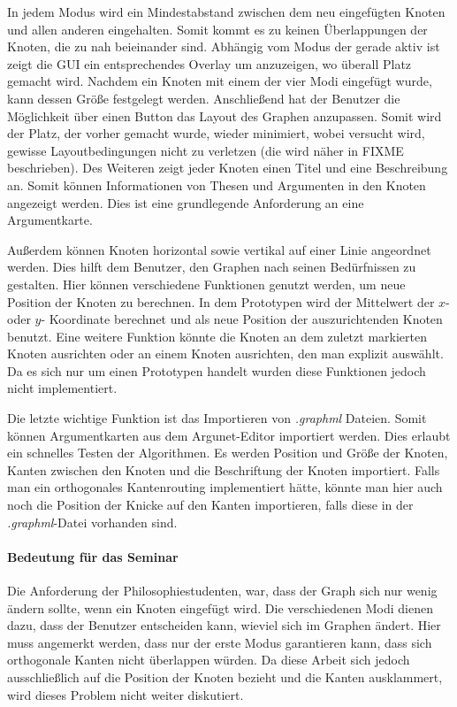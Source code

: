 In jedem Modus wird ein Mindestabstand zwischen dem neu eingefügten Knoten und allen
anderen eingehalten. Somit kommt es zu keinen Überlappungen der Knoten, die zu nah
beieinander sind. Abhängig vom Modus der gerade aktiv ist zeigt die GUI ein entsprechendes
Overlay um anzuzeigen, wo überall Platz gemacht wird. Nachdem ein Knoten mit einem der
vier Modi eingefügt wurde, kann dessen Größe festgelegt werden. Anschließend hat der
Benutzer die Möglichkeit über einen Button das Layout des Graphen anzupassen. Somit wird
der Platz, der vorher gemacht wurde, wieder minimiert, wobei versucht wird, gewisse
Layoutbedingungen nicht zu verletzen (die wird näher in FIXME beschrieben).
Des Weiteren zeigt jeder Knoten einen Titel und eine Beschreibung an. Somit können
Informationen von Thesen und Argumenten in den Knoten angezeigt werden. Dies ist eine
grundlegende Anforderung an eine Argumentkarte.

Außerdem können Knoten horizontal sowie vertikal auf einer Linie angeordnet werden. Dies
hilft dem Benutzer, den Graphen nach seinen Bedürfnissen zu gestalten. Hier können
verschiedene Funktionen genutzt werden, um neue Position der Knoten zu berechnen. In
dem Prototypen wird der Mittelwert der $x$- oder $y$- Koordinate berechnet und als neue Position
der auszurichtenden Knoten benutzt. Eine weitere Funktion könnte die Knoten an dem zuletzt
markierten Knoten ausrichten oder an einem Knoten ausrichten, den man explizit auswählt.
Da es sich nur um einen Prototypen handelt wurden diese Funktionen jedoch nicht
implementiert.

Die letzte wichtige Funktion ist das Importieren von \textit{.graphml} Dateien. Somit können
Argumentkarten aus dem Argunet-Editor importiert werden. Dies erlaubt ein schnelles Testen
der Algorithmen. Es werden Position und Größe der Knoten, Kanten zwischen den Knoten
und die Beschriftung der Knoten importiert. Falls man ein orthogonales Kantenrouting
implementiert hätte, könnte man hier auch noch die Position der Knicke auf den Kanten
importieren, falls diese in der \textit{.graphml}-Datei vorhanden sind.

\paragraph{Bedeutung für das Seminar}

Die Anforderung der Philosophiestudenten, war, dass der Graph sich nur wenig ändern sollte,
wenn ein Knoten eingefügt wird. Die verschiedenen Modi dienen dazu, dass der Benutzer
entscheiden kann, wieviel sich im Graphen ändert. Hier muss angemerkt werden, dass nur
der erste Modus garantieren kann, dass sich orthogonale Kanten nicht überlappen würden.
Da diese Arbeit sich jedoch ausschließlich auf die Position der Knoten bezieht und die Kanten
ausklammert, wird dieses Problem nicht weiter diskutiert.

